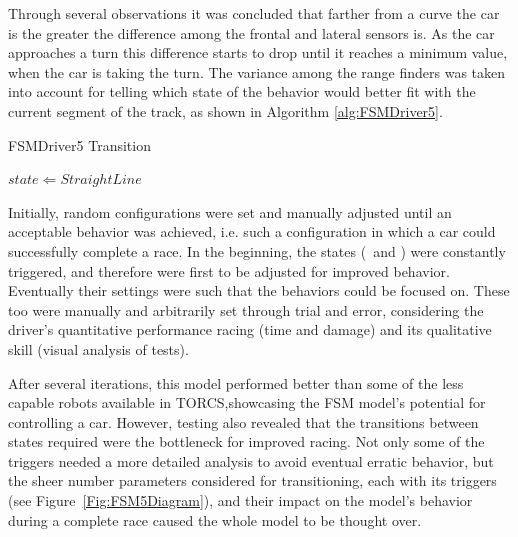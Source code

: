 Through several observations it was concluded that farther from a curve the car is the greater the difference among the frontal and lateral sensors is. As the car approaches a turn this difference starts to drop until it reaches a minimum value, when the car is taking the turn. The variance among the range finders was taken into account for telling which state of the  behavior would better fit with the current segment of the track, as shown in Algorithm \ref{alg:FSMDriver5}.

\begin{algorithm}[h]%
\caption{FSMDriver5 Transition}%
\label{alg:FSMDriver5}%
\begin{algorithmic}
   		\STATE $state \Leftarrow StraightLine$
   	\ENDIF
\end{algorithmic}
\end{algorithm}

Initially, random configurations were set and manually adjusted until an acceptable behavior was achieved, i.e. such a configuration in which a car could successfully complete a race. In the beginning, the  states (\OT~and \St) were constantly triggered, and therefore were first to be adjusted for improved behavior. Eventually their settings were such that the  behaviors could be focused on. These too were manually and arbitrarily set through trial and error, considering the driver's quantitative performance racing (time and damage) and its qualitative skill (visual analysis of tests).

After several iterations, this model performed better than some of the less capable robots available in TORCS,showcasing the FSM model's potential for controlling a car. However, testing also revealed that the transitions between states required were the bottleneck for improved racing. Not only some of the triggers needed a more detailed analysis to avoid eventual erratic behavior, but the sheer number parameters considered for transitioning, each with its triggers (see Figure~\ref{Fig:FSM5Diagram}), and their impact on the model's behavior during a complete race caused the whole model to be thought over.

